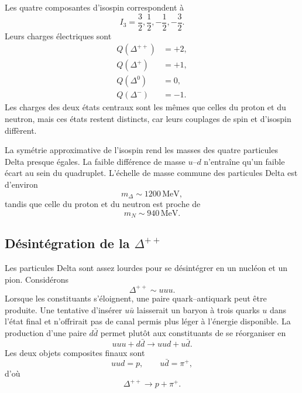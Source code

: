 Les quatre composantes d’isospin correspondent à
\begin{equation}
I_3=\frac32,\frac12,-\frac12,-\frac32.
\end{equation}
Leurs charges électriques sont
\begin{align}
Q(\Delta^{++})&=+2,\\
Q(\Delta^{+})&=+1,\\
Q(\Delta^{0})&=0,\\
Q(\Delta^{-})&=-1.
\end{align}
Les charges des deux états centraux sont les mêmes que celles du proton et du neutron, mais ces états restent distincts, car leurs couplages de spin et d’isospin diffèrent.

La symétrie approximative de l’isospin rend les masses des quatre particules Delta presque égales. La faible différence de masse \(u\)--\(d\) n’entraîne qu’un faible écart au sein du quadruplet. L’échelle de masse commune des particules Delta est d’environ
\begin{equation}
m_\Delta\sim1200\,\mathrm{MeV},
\end{equation}
tandis que celle du proton et du neutron est proche de
\begin{equation}
m_N\sim940\,\mathrm{MeV}.
\end{equation}

\subsection{Désintégration de la \texorpdfstring{\(\Delta^{++}\)}{Delta++}}

Les particules Delta sont assez lourdes pour se désintégrer en un nucléon et un pion. Considérons
\begin{equation}
\Delta^{++}\sim uuu.
\end{equation}
Lorsque les constituants s’éloignent, une paire quark--antiquark peut être produite. Une tentative d’insérer \(u\bar u\) laisserait un baryon à trois quarks \(u\) dans l’état final et n’offrirait pas de canal permis plus léger à l’énergie disponible. La production d’une paire \(d\bar d\) permet plutôt aux constituants de se réorganiser en
\begin{equation}
uuu+d\bar d
\longrightarrow
uud+u\bar d.
\end{equation}
Les deux objets composites finaux sont
\begin{equation}
uud=p,
\qquad
u\bar d=\pi^+,
\end{equation}
d’où
\begin{equation}
\Delta^{++}\longrightarrow p+\pi^+.
\end{equation}

